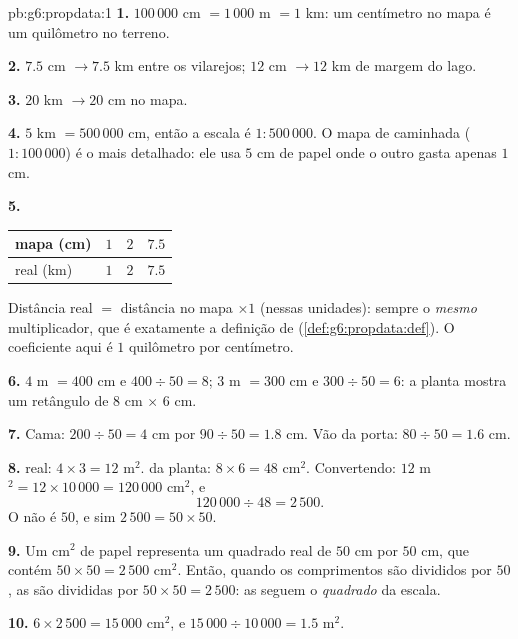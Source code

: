 \begin{solution}{pb:g6:propdata:1}
\textbf{1.} $100\,000$ cm $= 1\,000$ m $= 1$ km: um centímetro no mapa
é um quilômetro no terreno.

\textbf{2.} $7.5$ cm $\rightarrow 7.5$ km entre os vilarejos;
$12$ cm $\rightarrow 12$ km de margem do lago.

\textbf{3.} $20$ km $\rightarrow 20$ cm no mapa.

\textbf{4.} $5$ km $= 500\,000$ cm, então a escala é $1:500\,000$. O
mapa de caminhada ($1:100\,000$) é o mais detalhado: ele usa $5$ cm de
papel onde o outro gasta apenas $1$ cm.

\textbf{5.}
\begin{center}
\renewcommand{\arraystretch}{1.2}
\begin{tabular}{l|ccc}
mapa (cm) & $1$ & $2$ & $7.5$ \\
\hline
real (km) & $1$ & $2$ & $7.5$ \\
\end{tabular}
\end{center}
Distância real $=$ distância no mapa $\times 1$ (nessas unidades):
sempre o \emph{mesmo} multiplicador, que é exatamente a definição de
 (\cref{def:g6:propdata:def}). O coeficiente aqui é
$1$ quilômetro por centímetro.

\textbf{6.} $4$ m $= 400$ cm e $400 \div 50 = 8$; $3$ m $= 300$ cm e
$300 \div 50 = 6$: a planta mostra um retângulo de
$8$ cm $\times$ $6$ cm.

\textbf{7.} Cama: $200 \div 50 = 4$ cm por $90 \div 50 = 1.8$ cm. Vão
da porta: $80 \div 50 = 1.6$ cm.

\textbf{8.}  real: $4 \times 3 = 12$ m$^2$.  da planta:
$8 \times 6 = 48$ cm$^2$. Convertendo:
$12$ m$^2 = 12 \times 10\,000 = 120\,000$ cm$^2$, e
\[
120\,000 \div 48 = 2\,500 .
\]
O  não é $50$, e sim $2\,500 = 50 \times 50$.

\textbf{9.} Um cm$^2$ de papel representa um quadrado real de $50$ cm
por $50$ cm, que contém $50 \times 50 = 2\,500$ cm$^2$. Então, quando
os comprimentos são divididos por $50$, as  são divididas por
$50 \times 50 = 2\,500$: as  seguem o \emph{quadrado} da escala.

\textbf{10.} $6 \times 2\,500 = 15\,000$ cm$^2$, e
$15\,000 \div 10\,000 = 1.5$ m$^2$.


\end{solution}
